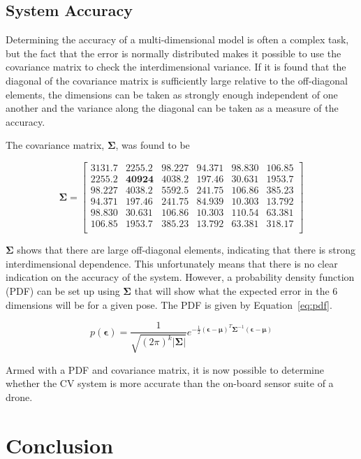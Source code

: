 \subsection{System Accuracy}

Determining the accuracy of a multi-dimensional model is often a complex task, but the fact that the error is normally distributed makes it possible to use the covariance matrix to check the interdimensional variance. If it is found that the diagonal of the covariance matrix is sufficiently large relative to the off-diagonal elements, the dimensions can be taken as strongly enough independent of one another and the variance along the diagonal can be taken as a measure of the accuracy. 

The covariance matrix, $\bm{\Sigma}$, was found to be 

\[
  \bm{\Sigma} = 
  \begin{bmatrix}
    \bm{3131.7} & 2255.2 & 98.227 & 94.371 &  98.830 & 106.85 \\ 
    2255.2 & \bm{40924}  & 4038.2 & 197.46 &  30.631 & 1953.7 \\
    98.227 & 4038.2 & \bm{5592.5} & 241.75 &  106.86 & 385.23 \\
    94.371 & 197.46 & 241.75 & \bm{84.939} &  10.303 & 13.792 \\
    98.830 & 30.631 & 106.86 & 10.303 &  \bm{110.54} & 63.381 \\
    106.85 & 1953.7 & 385.23 & 13.792 &  63.381 & \bm{318.17} \\
  \end{bmatrix}
\]

$\bm{\Sigma}$ shows that there are large off-diagonal elements, indicating that there is strong interdimensional dependence. This unfortunately means that there is no clear indication on the accuracy of the system. However, a probability density function (PDF) can be set up using $\bm{\Sigma}$ that will show what the expected error in the 6 dimensions will be for a given pose. The PDF is given by Equation~\ref{eq:pdf}.

\begin{equation}
  \label{eq:pdf}
  p(\bm{\epsilon}) = \frac{1}{\sqrt{{(2\pi)}^k\lvert\bm{\Sigma}\rvert}}e^{-\frac{1}{2}{(\bm{\epsilon} - \bm{\mu})}^T\bm{\Sigma}^{-1}(\bm{\epsilon} - \bm{\mu})}
\end{equation}

Armed with a PDF and covariance matrix, it is now possible to determine whether the CV system is more accurate than the on-board sensor suite of a drone. 

\section{Conclusion}

